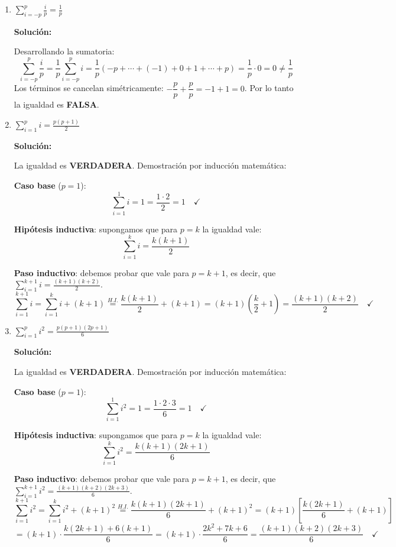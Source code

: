 \documentclass[12pt]{article}
\newcommand{\solucion}{%
    \vspace{0.8em}%
    \textbf{Solución:}%
}
\begin{document}
\begin{enumerate}[label=\alph*.-]
    \item $\displaystyle\sum_{i=-p}^{p}\frac{i}{p} = \frac{1}{p}$

    \solucion

    Desarrollando la sumatoria:
    \[
    \sum_{i=-p}^{p}\frac{i}{p} = \frac{1}{p}\sum_{i=-p}^{p}i
    = \frac{1}{p}\left(-p + \cdots + (-1) + 0 + 1 + \cdots + p\right)
    = \frac{1}{p}\cdot 0 = 0 \neq \frac{1}{p}
    \]
    Los términos se cancelan simétricamente: $-\dfrac{p}{p}+\dfrac{p}{p} = -1+1 = 0$.
    Por lo tanto la igualdad es \textbf{FALSA}.

    \item $\displaystyle\sum_{i=1}^{p} i = \frac{p(p+1)}{2}$

    \solucion

    La igualdad es \textbf{VERDADERA}. Demostración por inducción matemática:

    \textbf{Caso base} ($p=1$):
    \[
    \sum_{i=1}^{1} i = 1 = \frac{1\cdot2}{2} = 1 \quad \checkmark
    \]

    \textbf{Hipótesis inductiva}: supongamos que para $p=k$ la igualdad vale:
    \[
    \sum_{i=1}^{k} i = \frac{k(k+1)}{2}
    \]

    \textbf{Paso inductivo}: debemos probar que vale para $p=k+1$, es decir, que
    $\displaystyle\sum_{i=1}^{k+1} i = \frac{(k+1)(k+2)}{2}$.
    \[
    \sum_{i=1}^{k+1} i = \sum_{i=1}^{k} i + (k+1)
    \overset{H.I.}{=} \frac{k(k+1)}{2} + (k+1)
    = (k+1)\left(\frac{k}{2}+1\right)
    = \frac{(k+1)(k+2)}{2} \quad \checkmark
    \]

    \newpage
    \item $\displaystyle\sum_{i=1}^{p} i^2 = \frac{p(p+1)(2p+1)}{6}$

    \solucion

    La igualdad es \textbf{VERDADERA}. Demostración por inducción matemática:

    \textbf{Caso base} ($p=1$):
    \[
    \sum_{i=1}^{1} i^2 = 1 = \frac{1\cdot2\cdot3}{6} = 1 \quad \checkmark
    \]

    \textbf{Hipótesis inductiva}: supongamos que para $p=k$ la igualdad vale:
    \[
    \sum_{i=1}^{k} i^2 = \frac{k(k+1)(2k+1)}{6}
    \]

    \textbf{Paso inductivo}: debemos probar que vale para $p=k+1$, es decir, que
    $\displaystyle\sum_{i=1}^{k+1} i^2 = \frac{(k+1)(k+2)(2k+3)}{6}$.
    \[
    \sum_{i=1}^{k+1} i^2 = \sum_{i=1}^{k} i^2 + (k+1)^2
    \overset{H.I.}{=} \frac{k(k+1)(2k+1)}{6} + (k+1)^2
    = (k+1)\left[\frac{k(2k+1)}{6} + (k+1)\right]
    \]
    \[
    = (k+1)\cdot\frac{k(2k+1)+6(k+1)}{6}
    = (k+1)\cdot\frac{2k^2+7k+6}{6}
    = \frac{(k+1)(k+2)(2k+3)}{6} \quad \checkmark
    \]


\end{enumerate}
\end{document}
